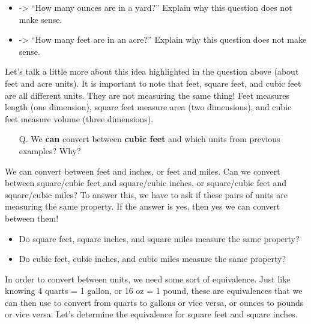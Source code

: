 \documentclass{ximera}
\begin{document}
\begin{exploration}
\begin{itemize}
\item-> ``How many ounces are in a yard?'' Explain why this question does not make sense.
\item-> ``How many feet are in an acre?'' Explain why this question does not make sense.
\end{itemize}
Let’s talk a little more about this idea highlighted in the question above (about feet and acre units).  It is important to note that feet, square feet, and cubic feet are all different units.  They are not measuring the same thing!  Feet measures length (one dimension), square feet measure area (two dimensions), and cubic feet measure volume (three dimensions).
\begin{enumerate}
	\item[Q.] We \textbf{can} convert between \textbf{cubic feet} and {which units} from previous examples?  Why?
\end{enumerate}
We can convert between feet and inches, or feet and miles.  Can we convert between square/cubic feet and square/cubic inches, or square/cubic feet and square/cubic miles?  To answer this, we have to ask if these pairs of units are measuring the same property.  If the answer is yes, then yes we can convert between them!
\begin{itemize}
\item Do square feet, square inches, and square miles measure the same property?
\item Do cubic feet, cubic inches, and cubic miles measure the same property?
\end{itemize}
In order to convert between units, we need some sort of equivalence.  Just like knowing 4 quarts = 1 gallon, or 16 oz = 1 pound, these are equivalences that we can then use to convert from quarts to gallons or vice versa, or ounces to pounds or vice versa.  Let’s determine the equivalence for square feet and square inches.
\begin{image}

\end{image}
\end{exploration}
\end{document}
